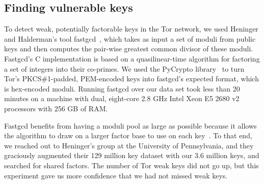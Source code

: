 \subsection{Finding vulnerable keys}
\label{sec:vulnerable-keys}
To detect weak, potentially factorable keys in the Tor network, we used Heninger
and Halderman's tool fastgcd~\cite{fastgcd}, which takes as input a set
of moduli from public keys and then computes the pair-wise greatest common
divisor of these moduli.  Fastgcd's C implementation is based on a
quasilinear-time algorithm for factoring a set of integers into their co-primes.
We used the PyCrypto library~\cite{pycrypto} to turn Tor's PKCS\#1-padded,
PEM-encoded keys into fastgcd's expected format, which is hex-encoded
moduli.  Running fastgcd over our data set took less than 20 minutes on
a machine with dual, eight-core 2.8 GHz Intel Xeon E5 2680 v2 processors with
256 GB of RAM.

Fastgcd benefits from having a moduli pool as large as possible
because it allows the algorithm to draw on a larger factor base to use on each
key~\cite{Heninger2012a}.  To that end, we reached out to Heninger's group at
the University of Pennsylvania, and they graciously augmented their 129 million
key dataset with our 3.6 million keys, and searched for shared factors.  The
number of Tor weak keys did not go up, but this experiment gave us more
confidence that we had not missed weak keys.
